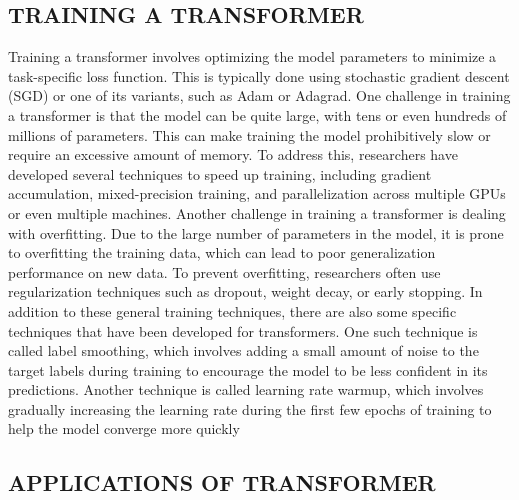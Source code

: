 \documentclass[letterpaper, 10 pt, conference]{ieeeconf}  %
\begin{document}
\subsection{TRAINING A TRANSFORMER}

Training a transformer involves optimizing the model parameters to minimize a task-specific loss function. This is typically done
using stochastic gradient descent (SGD) or one of its variants, such as Adam or Adagrad.
One challenge in training a transformer is that the model can be quite large, with tens or even hundreds of millions of
parameters. This can make training the model prohibitively slow or require an excessive amount of memory. To address this,
researchers have developed several techniques to speed up training, including gradient accumulation, mixed-precision training, and
parallelization across multiple GPUs or even multiple machines.
Another challenge in training a transformer is dealing with overfitting. Due to the large number of parameters in the
model, it is prone to overfitting the training data, which can lead to poor generalization performance on new data. To prevent
overfitting, researchers often use regularization techniques such as dropout, weight decay, or early stopping.
In addition to these general training techniques, there are also some specific techniques that have been developed for
transformers. One such technique is called label smoothing, which involves adding a small amount of noise to the target labels
during training to encourage the model to be less confident in its predictions. Another technique is called learning rate warmup,
which involves gradually increasing the learning rate during the first few epochs of training to help the model converge more
quickly

\subsection{APPLICATIONS OF TRANSFORMER}
\end{document}
